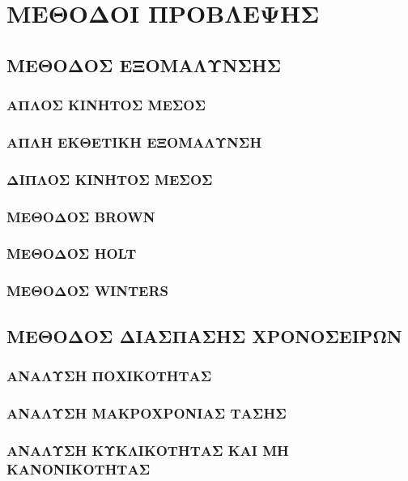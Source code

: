
\chapter{ΜΕΘΟΔΟΙ ΠΡΟΒΛΕΨΗΣ}


\section{ΜΕΘΟΔΟΣ ΕΞΟΜΑΛΥΝΣΗΣ}


\subsection{ΑΠΛΟΣ ΚΙΝΗΤΟΣ ΜΕΣΟΣ}
\subsection{ ΑΠΛΗ ΕΚΘΕΤΙΚΗ ΕΞΟΜΑΛΥΝΣΗ}

\subsection{ΔΙΠΛΟΣ ΚΙΝΗΤΟΣ ΜΕΣΟΣ}
\subsection{ΜΕΘΟΔΟΣ BROWN}
\subsection{ ΜΕΘΟΔΟΣ HOLT}
\subsection{ΜΕΘΟΔΟΣ WINTERS}
\section{ΜΕΘΟΔΟΣ ΔΙΑΣΠΑΣΗΣ ΧΡΟΝΟΣΕΙΡΩΝ}
\subsection{ΑΝΑΛΥΣΗ ΠΟΧΙΚΟΤΗΤΑΣ }
\subsection{ΑΝΑΛΥΣΗ ΜΑΚΡΟΧΡΟΝΙΑΣ ΤΑΣΗΣ}
\subsection{ΑΝΑΛΥΣΗ ΚΥΚΛΙΚΟΤΗΤΑΣ ΚΑΙ ΜΗ ΚΑΝΟΝΙΚΟΤΗΤΑΣ}







\endinput

